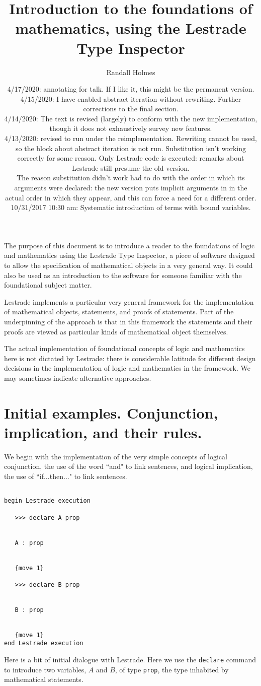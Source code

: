 \documentclass[12pt]{article}
\title{Introduction to the foundations of mathematics, using the Lestrade Type Inspector}
\author{Randall Holmes}
\date{4/17/2020:  annotating for talk.  If I like it, this might be the permanent version.  4/15/2020:  I have enabled abstract iteration without rewriting.  Further corrections to the final section.\\4/14/2020:  The text is revised (largely) to conform with the new implementation, though it does not exhaustively survey new features.\\4/13/2020:  revised to run under the reimplementation.  Rewriting cannot be used, so the block about abstract iteration is not run.  Substitution isn't working correctly for some reason.  Only Lestrade code is executed:  remarks about Lestrade still presume the old version.\\
The reason substitution didn't work had to do with the order in which its arguments were declared:  the new version puts
implicit arguments in in the actual order in which they appear, and this can force a need for a different order.\\
10/31/2017 10:30 am:  Systematic introduction of terms with bound variables.}
\begin{document}
\maketitle

\tableofcontents

\newpage

The purpose of this document is to introduce a reader to the foundations of logic and mathematics using the Lestrade Type Inspector, a piece of software designed to allow the specification of mathematical objects in a very general way.  It could also be used as an introduction to the software for someone familiar with the foundational subject matter.

Lestrade implements a particular very general framework for the implementation of mathematical objects, statements, and proofs of statements.  Part of the underpinning of the approach is that in this framework the statements and their proofs are viewed as  particular kinds of mathematical object themselves.

The actual implementation of foundational concepts of logic and mathematics here is not dictated by Lestrade:  there is considerable latitude for different design decisions in the implementation of logic and mathematics in the framework.  We may sometimes indicate alternative approaches.

\section{Initial examples.  Conjunction, implication, and their rules.}

We begin with the implementation of the very simple concepts of logical conjunction, the use of the word ``and" to link sentences, and logical implication, the use of ``if$\ldots$then$\ldots$" to link sentences.

\begin{verbatim}

begin Lestrade execution

   >>> declare A prop


   A : prop


   {move 1}

   >>> declare B prop


   B : prop


   {move 1}
end Lestrade execution
\end{verbatim}

Here is a bit of initial dialogue with Lestrade.  Here we use the {\tt declare} command to introduce two variables, $A$ and $B$, of type {\tt prop},
the type inhabited by mathematical statements.
\end{document}
